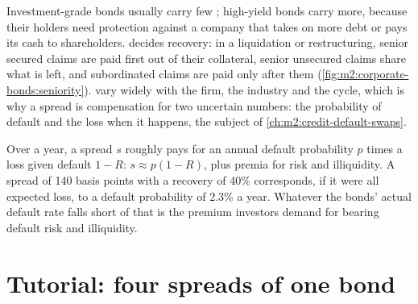 Investment-grade bonds usually carry few ; high-yield bonds carry more,
because their holders need protection against a company that takes on more debt
or pays its cash to shareholders.  decides recovery: in a liquidation or
restructuring, senior secured claims are paid first out of their collateral, senior
unsecured claims share what is left, and subordinated claims are paid only after
them (\cref{fig:m2:corporate-bonds:seniority}).  vary widely with the firm, the industry and the cycle, which
is why a spread is compensation for two uncertain numbers: the probability of
default and the loss when it happens, the subject of
\cref{ch:m2:credit-default-swaps}.

\begin{remark}\label{rem:m2:corporate-bonds:loss}
Over a year, a spread $s$ roughly pays for an annual default probability $p$ times a
loss given default $1 - R$: $s \approx p(1 - R)$, plus premia for risk and
illiquidity. A spread of 140 basis points with a recovery of 40\% corresponds, if it
were all expected loss, to a default probability of 2.3\% a year. Whatever the
bonds' actual default rate falls short of that is the premium investors demand for
bearing default risk and illiquidity.
\end{remark}

\section{Tutorial: four spreads of one bond}\label{tut:m2:corporate-bonds:spreads}

